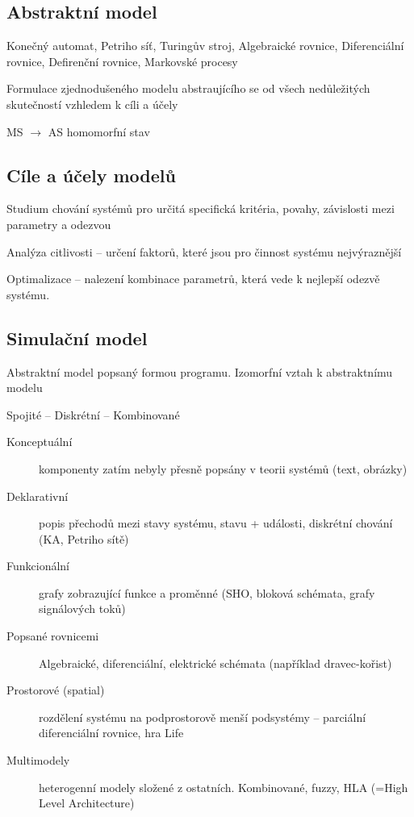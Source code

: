 \documentclass[a4paper, 11pt]{report}
\begin{document}
\subsection{Abstraktní model}
Konečný automat, Petriho síť, Turingův stroj, Algebraické rovnice, Diferenciální rovnice, Defirenční rovnice, Markovské procesy

Formulace zjednodušeného modelu abstraujícího se od všech nedůležitých skutečností vzhledem k cíli a účely

MS $\to$ AS homomorfní stav

\subsection{Cíle a účely modelů}
Studium chování systémů pro určitá specifická kritéria, povahy, závislosti mezi parametry a odezvou

Analýza citlivosti -- určení faktorů, které jsou pro činnost systému nejvýraznější

Optimalizace -- nalezení kombinace parametrů, která vede k nejlepší odezvě systému.

\subsection{Simulační model}

Abstraktní model popsaný formou programu. Izomorfní vztah k abstraktnímu modelu

Spojité -- Diskrétní -- Kombinované
\begin{description}
	\item[Konceptuální] komponenty zatím nebyly přesně popsány v teorii systémů (text, obrázky)
	\item[Deklarativní] popis přechodů mezi stavy systému, stavu + události, diskrétní chování (KA, Petriho sítě)
	\item[Funkcionální] grafy zobrazující funkce a proměnné (SHO, bloková schémata, grafy signálových toků)
	\item[Popsané rovnicemi] Algebraické, diferenciální, elektrické schémata (například dravec-kořist)
	\item[Prostorové (spatial)] rozdělení systému na podprostorově menší podsystémy -- parciální diferenciální rovnice, hra Life
	\item[Multimodely] heterogenní modely složené z ostatních. Kombinované, fuzzy, HLA (=High Level Architecture)
\end{description}
\end{document}
